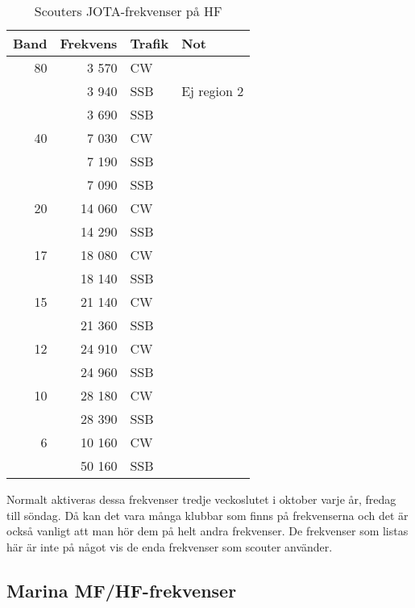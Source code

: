 \begin{table}[H]
\centering
\begin{tabular}{rrll}
	\textbf{Band} & \textbf{Frekvens} & \textbf{Trafik} & \textbf{Not} \\ \hline

               80 & 3 570  & CW  &             \\
	              & 3 940  & SSB & Ej region 2 \\
	              & 3 690  & SSB &             \\ \hline
	           40 & 7 030  & CW  &             \\
	              & 7 190  & SSB &             \\
	              & 7 090  & SSB &             \\ \hline
	           20 & 14 060 & CW  &             \\
	              & 14 290 & SSB &             \\ \hline
	           17 & 18 080 & CW  &             \\
	              & 18 140 & SSB &             \\ \hline
	           15 & 21 140 & CW  &             \\
	              & 21 360 & SSB &             \\ \hline
	           12 & 24 910 & CW  &             \\
	              & 24 960 & SSB &             \\ \hline
	           10 & 28 180 & CW  &             \\
	              & 28 390 & SSB &             \\ \hline
	            6 & 10 160 & CW  &             \\
	              & 50 160 & SSB &             \\ \hline
\end{tabular}
\caption{Scouters JOTA-frekvenser på HF}
\end{table}

Normalt aktiveras dessa frekvenser tredje veckoslutet i oktober varje år, fredag till söndag. Då kan det vara många klubbar som finns på frekvenserna och det är också vanligt att man hör dem på helt andra frekvenser. De frekvenser som listas här är inte på något vis de enda frekvenser som scouter använder.

\subsection{Marina MF/HF-frekvenser}

